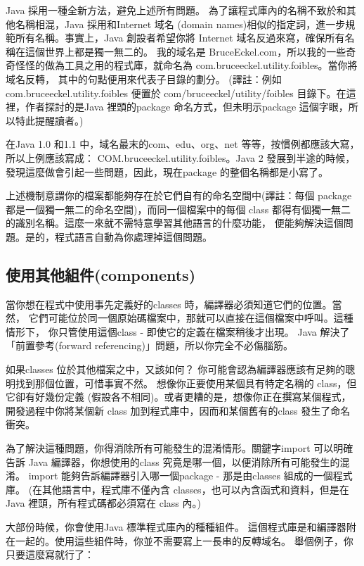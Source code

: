 Java 採用一種全新方法，避免上述所有問題。
為了讓程式庫內的名稱不致於和其他名稱相混，Java 採用和Internet 域名
(domain names)相似的指定詞，進一步規範所有名稱。事實上，Java 創設者希望你將
Internet 域名反過來寫，確保所有名稱在這個世界上都是獨一無二的。
我的域名是
BruceEckel.com，所以我的一些奇奇怪怪的做為工具之用的程式庫，就命名為
com.bruceeckel.utility.foibles。當你將域名反轉，
其中的句點便用來代表子目錄的劃分。
(譯註：例如com.bruceeckel.utility.foibles 便置於
com/bruceeckel/utility/foibles 目錄下。在這裡，作者探討的是Java
裡頭的package 命名方式，但未明示package 這個字眼，所以特此提醒讀者。)

在Java 1.0 和1.1 中，域名最末的com、edu、org、net 等等，按慣例都應該大寫，
所以上例應該寫成： COM.bruceeckel.utility.foibles。Java 2 發展到半途的時候，
發現這麼做會引起一些問題，因此，現在package 的整個名稱都是小寫了。

上述機制意謂你的檔案都能夠存在於它們自有的命名空間中(譯註：每個
package 都是一個獨一無二的命名空間)，而同一個檔案中的每個
class 都得有個獨一無二的識別名稱。這麼一來就不需特意學習其他語言的什麼功能，
便能夠解決這個問題。是的，程式語言自動為你處理掉這個問題。
\subsection{使用其他組件(components)}
當你想在程式中使用事先定義好的classes 時，編譯器必須知道它們的位置。當然，
它們可能位於同一個原始碼檔案中，那就可以直接在這個檔案中呼叫。這種情形下，
你只管使用這個class - 即使它的定義在檔案稍後才出現。
Java 解決了「前置參考(forward referencing)」問題，所以你完全不必傷腦筋。

如果classes 位於其他檔案之中，又該如何？
你可能會認為編譯器應該有足夠的聰明找到那個位置，可惜事實不然。
想像你正要使用某個具有特定名稱的 class，但它卻有好幾份定義
(假設各不相同)。或者更糟的是，想像你正在撰寫某個程式，開發過程中你將某個新
class 加到程式庫中，因而和某個舊有的class 發生了命名衝突。

為了解決這種問題，你得消除所有可能發生的混淆情形。關鍵字import 可以明確告訴
Java 編譯器，你想使用的class 究竟是哪一個，以便消除所有可能發生的混淆。
import 能夠告訴編譯器引入哪一個package - 那是由classes 組成的一個程式庫。
(在其他語言中，程式庫不僅內含
classes，也可以內含函式和資料，但是在Java 裡頭，所有程式碼都必須寫在
class 內。)

大部份時候，你會使用Java 標準程式庫內的種種組件。
這個程式庫是和編譯器附在一起的。使用這些組件時，你並不需要寫上一長串的反轉域名。
舉個例子，你只要這麼寫就行了：

